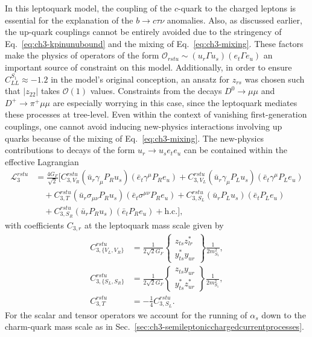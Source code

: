 In this leptoquark model, the coupling of the $c$-quark to the charged leptons
is essential for the explanation of the $b \to c \tau \nu$ anomalies. Also, as
discussed earlier, the up-quark couplings cannot be entirely avoided due to the
stringency of Eq.~\eqref{eq:ch3-kpinunubound} and the mixing of
Eq.~\eqref{eq:ch3-mixing}. These factors make the physics of operators of the form
$\mathscr{O}_{rstu} \sim (u_r \Gamma u_s) (e_t \Gamma e_u)$ an important
source of constraint on this model. Additionally, in order to ensure
$C_{LL}^{S_{1}} \approx -1.2$ in the model's original conception, an ansatz for
$z_{rs}$ was chosen such that $|z_{22}|$ takes $\mathscr{O}(1)$ values.
Constraints from the decays $D^0 \rightarrow \mu \mu$ and $D^+ \rightarrow \pi^+
\mu \mu$ are especially worrying in this case, since the leptoquark mediates
these processes at tree-level. Even within the context of vanishing
first-generation couplings, one cannot avoid inducing new-physics interactions
involving up quarks because of the mixing of Eq.~\eqref{eq:ch3-mixing}. The
new-physics contributions to decays of the form $u_r \to u_s e_t e_u$ can
be contained within the effective Lagrangian
\begin{equation}
  \begin{split}
    \mathscr{L}_3^{rstu}
    &= \frac{4 G_F}{\sqrt{2}} \bigg[  C^{rstu}_{3, V_{R}}  (\bar{u}_r \gamma_\mu P_R u_s)(\bar{e}_t \gamma^\mu P_R e_u) + C_{3, V_{L}}^{rstu} (\bar{u}_r \gamma_\mu P_L u_s)(\bar{e}_t \gamma^\mu P_L e_u)\\ &\quad + C_{3, T}^{rstu} (\bar{u}_r \sigma_{\mu\nu} P_R u_s)(\bar{e}_t \sigma^{\mu\nu} P_R e_u) + C_{3, S_L}^{rstu} (\bar{u}_r P_L u_s)(\bar{e}_t P_L e_u)\\ &\quad + C_{3, S_R}^{rstu}(\bar{u}_r P_R u_s)(\bar{e}_t P_R e_u) + \text{h.c.}
    \bigg],
  \end{split}
\end{equation}
with coefficients $C_{3,r}$ at the leptoquark mass scale given by
\begin{align}
  C_{3,\{V_L,V_R\}}^{rstu} &= \frac{1}{2\sqrt{2} G_F} \left\{ \begin{matrix} z_{ts}z_{lr}^*\\ y^*_{ts} y_{ur} \end{matrix}  \right\} \frac{1}{2 m_{S_{1}}^2},\\
  C_{3,\{S_L,S_R\}}^{rstu} &= \frac{1}{2\sqrt{2} G_F} \left\{ \begin{matrix} z_{ts}y_{ur}\\ y^*_{ts} z^*_{ur} \end{matrix}  \right\} \frac{1}{2 m_{S_{1}}^2},\\
  C_{3,T}^{rstu} &= -\frac{1}{4} C^{rstu}_{3,S_L}.
\end{align}
For the scalar and tensor operators we account for the running of $\alpha_s$
down to the charm-quark mass scale as in
Sec.~\ref{sec:ch3-semileptonicchargedcurrentprocesses}.


